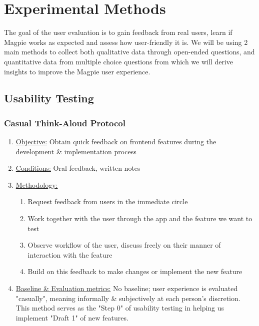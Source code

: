 \documentclass{report}
\begin{document}
\chapter{Experimental Methods}
The goal of the user evaluation is to gain feedback from real users, learn if
Magpie works as expected and assess how user-friendly it is. We will be using 2
main methods to collect both qualitative data through open-ended questions, and
quantitative data from multiple choice questions from which we will derive
insights to improve the Magpie user experience.
\section{Usability Testing}
\subsection{Casual Think-Aloud Protocol}
\begin{enumerate}
    \item \underline{Objective:} Obtain quick feedback on frontend features during the development \& implementation process
    \item \underline{Conditions:} Oral feedback, written notes
    \item \underline{Methodology:}
          \begin{enumerate}
              \item Request feedback from users in the immediate circle
              \item Work together with the user through the app and the feature we want to test
              \item Observe workflow of the user, discuss freely on their manner of interaction with the feature
              \item Build on this feedback to make changes or implement the new feature
          \end{enumerate}
    \item \underline{Baseline \& Evaluation metrics:} No baseline; user experience is evaluated "casually", meaning informally \& subjectively at each person's discretion. This method serves as the "Step 0" of usability testing in helping us implement "Draft 1" of new features.
\end{enumerate}
\end{document}
